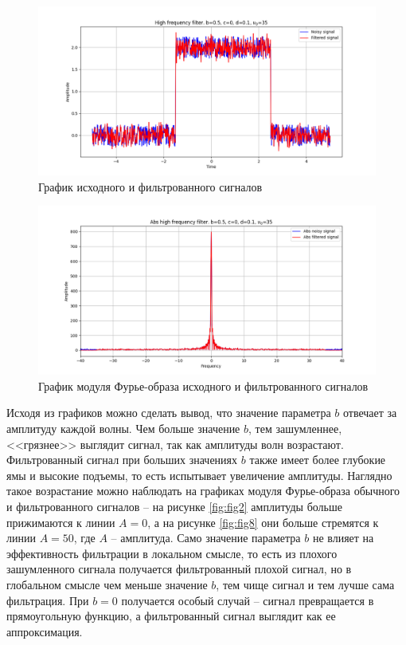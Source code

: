\documentclass[a4paper, 12pt]{article}
\begin{document}
    \begin{figure}[!htb]
        \centering
        \includegraphics[scale=0.485]{9_u_flt_u_nohigh.png}
        \captionsetup{skip=0pt}
        \caption{График исходного и фильтрованного сигналов}
        \label{fig:fig25}
    \end{figure}
    \begin{figure}[!htb]
        \centering
        \includegraphics[scale=0.485]{9_abs_u_U_nohigh.png}
        \captionsetup{skip=0pt}
        \caption{График модуля Фурье-образа исходного и фильтрованного сигналов}
        \label{fig:fig26}
    \end{figure}


    Исходя из графиков можно сделать вывод, что значение параметра $b$ отвечает за амплитуду каждой волны.
    Чем больше значение $b$, тем зашумленнее, <<грязнее>> выглядит сигнал, так как амплитуды волн возрастают.
    Фильтрованный сигнал при больших значениях $b$ также имеет более глубокие ямы и высокие подъемы, то есть
    испытывает увеличение амплитуды. Наглядно такое возрастание можно наблюдать на графиках модуля Фурье-образа
    обычного и фильтрованного сигналов -- на рисунке \ref{fig:fig2} амплитуды больше прижимаются к линии 
    $A=0$, а на рисунке \ref{fig:fig8} они больше стремятся к линии $A=50$, где $A$ -- амплитуда. Само значение
    параметра $b$ не влияет на эффективность фильтрации в локальном смысле, то есть из плохого зашумленного сигнала
    получается фильтрованный плохой сигнал, но в глобальном смысле чем меньше значение $b$, тем чище сигнал и тем лучше
    сама фильтрация. При $b=0$ получается особый случай -- сигнал превращается в прямоугольную функцию, а фильтрованный
    сигнал выглядит как ее аппроксимация.
\end{document}
